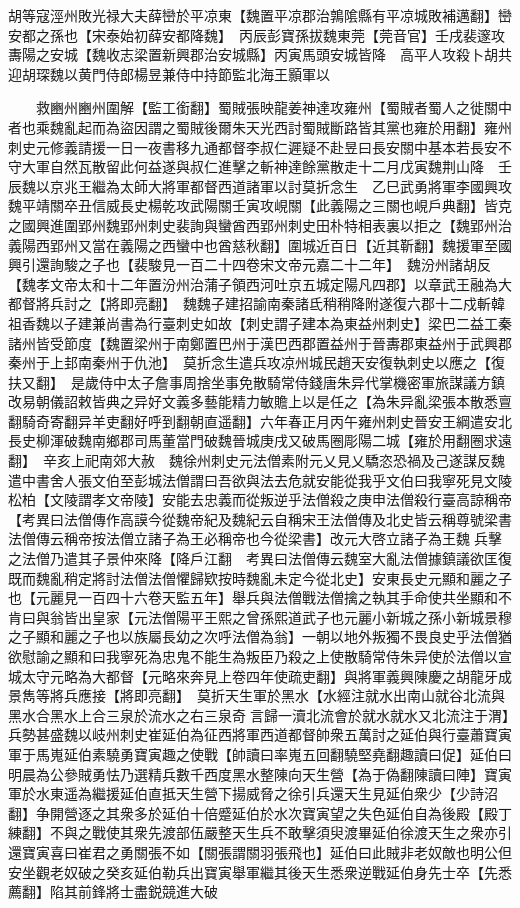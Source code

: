 胡等寇涇州敗光禄大夫薛巒於平凉東【魏置平凉郡治鶉隂縣有平凉城敗補邁翻】巒安都之孫也【宋泰始初薛安都降魏】　丙辰彭寶孫拔魏東莞【莞音官】壬戌裴邃攻夀陽之安城【魏收志梁置新興郡治安城縣】丙寅馬頭安城皆降　高平人攻殺卜胡共迎胡琛魏以黄門侍郎楊昱兼侍中持節監北海王顥軍以

　　救豳州豳州圍解【監工銜翻】蜀賊張映龍姜神達攻雍州【蜀賊者蜀人之徙關中者也乘魏亂起而為盜因謂之蜀賊後爾朱天光西討蜀賊斷路皆其黨也雍於用翻】雍州刺史元修義請援一日一夜書移九通都督李叔仁遲疑不赴昱曰長安關中基本若長安不守大軍自然瓦散留此何益遂與叔仁進擊之斬神達餘黨散走十二月戊寅魏荆山降　壬辰魏以京兆王繼為太師大將軍都督西道諸軍以討莫折念生　乙巳武勇將軍李國興攻魏平靖關卒丑信威長史楊乾攻武陽關壬寅攻峴關【此義陽之三關也峴戶典翻】皆克之國興進圍郢州魏郢州刺史裴詢與蠻酋西郢州刺史田朴特相表裏以拒之【魏郢州治義陽西郢州又當在義陽之西蠻中也酋慈秋翻】圍城近百日【近其靳翻】魏援軍至國興引還詢駿之子也【裴駿見一百二十四卷宋文帝元嘉二十二年】　魏汾州諸胡反【魏孝文帝太和十二年置汾州治蒲子領西河吐京五城定陽凡四郡】以章武王融為大都督將兵討之【將即亮翻】　魏魏子建招諭南秦諸氐稍稍降附遂復六郡十二戍斬韓祖香魏以子建兼尚書為行臺刺史如故【刺史謂子建本為東益州刺史】梁巴二益工秦諸州皆受節度【魏置梁州于南鄭置巴州于漢巴西郡置益州于晉夀郡東益州于武興郡秦州于上邽南秦州于仇池】　莫折念生遣兵攻凉州城民趙天安復執刺史以應之【復扶又翻】　是歲侍中太子詹事周捨坐事免散騎常侍錢唐朱异代掌機密軍旅謀議方鎮改易朝儀詔敕皆典之异好文義多藝能精力敏贍上以是任之【為朱异亂梁張本散悉亶翻騎奇寄翻异羊吏翻好呼到翻朝直遥翻】六年春正月丙午雍州刺史晉安王綱遣安北長史柳渾破魏南鄉郡司馬董當門破魏晉城庚戌又破馬圈彫陽二城【雍於用翻圈求遠翻】　辛亥上祀南郊大赦　魏徐州刺史元法僧素附元乂見乂驕恣恐禍及己遂謀反魏遣中書舍人張文伯至彭城法僧謂曰吾欲與法去危就安能從我乎文伯曰我寧死見文陵松柏【文陵謂孝文帝陵】安能去忠義而從叛逆乎法僧殺之庚申法僧殺行臺高諒稱帝　【考異曰法僧傳作高謨今從魏帝紀及魏紀云自稱宋王法僧傳及北史皆云稱尊號梁書法僧傳云稱帝按法僧立諸子為王必稱帝也今從梁書】改元大啓立諸子為王魏兵擊之法僧乃遣其子景仲來降【降戶江翻　考異曰法僧傳云魏室大亂法僧據鎮議欲匡復既而魏亂稍定將討法僧法僧懼歸欵按時魏亂未定今從北史】安東長史元顯和麗之子也【元麗見一百四十六卷天監五年】舉兵與法僧戰法僧擒之執其手命使共坐顯和不肯曰與翁皆出皇家【元法僧陽平王熙之曾孫熙道武子也元麗小新城之孫小新城景穆之子顯和麗之子也以族屬長幼之次呼法僧為翁】一朝以地外叛獨不畏良史乎法僧猶欲慰諭之顯和曰我寧死為忠鬼不能生為叛臣乃殺之上使散騎常侍朱异使於法僧以宣城太守元略為大都督【元略來奔見上卷四年使疏吏翻】與將軍義興陳慶之胡龍牙成景雋等將兵應接【將即亮翻】　莫折天生軍於黑水【水經注就水出南山就谷北流與黑水合黑水上合三泉於流水之右三泉奇言歸一瀆北流會於就水就水又北流注于渭】兵勢甚盛魏以岐州刺史崔延伯為征西將軍西道都督帥衆五萬討之延伯與行臺蕭寶寅軍于馬嵬延伯素驍勇寶寅趣之使戰【帥讀曰率嵬五回翻驍堅堯翻趣讀曰促】延伯曰明晨為公參賊勇怯乃選精兵數千西度黑水整陳向天生營【為于偽翻陳讀曰陣】寶寅軍於水東遥為繼援延伯直抵天生營下揚威脅之徐引兵還天生見延伯衆少【少詩沼翻】争開營逐之其衆多於延伯十倍蹙延伯於水次寶寅望之失色延伯自為後殿【殿丁練翻】不與之戰使其衆先渡部伍嚴整天生兵不敢擊須臾渡畢延伯徐渡天生之衆亦引還寶寅喜曰崔君之勇關張不如【關張謂關羽張飛也】延伯曰此賊非老奴敵也明公但安坐觀老奴破之癸亥延伯勒兵出寶寅舉軍繼其後天生悉衆逆戰延伯身先士卒【先悉薦翻】陷其前鋒將士盡鋭競進大破